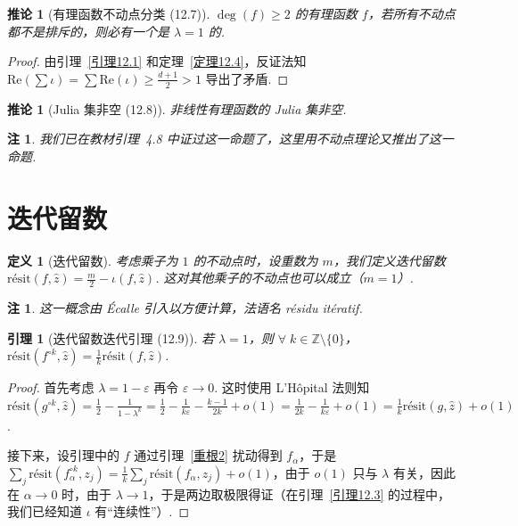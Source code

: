 \documentclass[11pt, a4paper, oneside]{ctexart}
\newtheorem{corollary}[theorem]{推论}
\newtheorem{definition}[theorem]{定义}
\newtheorem{lemma}[theorem]{引理}
\newtheorem{remark}[theorem]{注}
\newcommand{\Z}{\mathbb{Z}}
\newcommand{\re}{\mathrm{Re}}
\newcommand{\ri}{\mathrm{résit}}
\begin{document}
    \begin{corollary}[有理函数不动点分类 (12.7)]
        $\deg(f)\geq 2$ 的有理函数 $f$，若所有不动点都不是排斥的，则必有一个是 $\lambda=1$ 的.
    \end{corollary}
    \begin{proof}
        由引理~\ref{引理12.1} 和定理~\ref{定理12.4}，反证法知 $\re(\sum\iota)=\sum\re(\iota)\geq \frac{d+1}{2}>1$ 导出了矛盾.
    \end{proof}

    \begin{corollary}[Julia 集非空 (12.8)]
        非线性有理函数的 Julia 集非空.
    \end{corollary}
    \begin{remark}
        我们已在教材引理~4.8 中证过这一命题了，这里用不动点理论又推出了这一命题.
    \end{remark}

    \section{迭代留数}

    \begin{definition}[迭代留数]
        考虑乘子为 $1$ 的不动点时，设重数为 $m$，我们定义迭代留数 $\ri(f,\hat{z})=\frac{m}{2}-\iota(f,\hat{z})$. 这对其他乘子的不动点也可以成立（$m=1$）.
    \end{definition}
    \begin{remark}
        这一概念由 Écalle 引入以方便计算，法语名 résidu itératif.
    \end{remark}

    \begin{lemma}[迭代留数迭代引理 (12.9)]\label{引理12.9}
        若 $\lambda=1$，则 $\forall\;k\in\Z\setminus\{0\}$，$\ri(f^{\circ k},\hat{z})=\frac{1}{k}\ri(f,\hat{z})$.
    \end{lemma}
    \begin{proof}
        首先考虑 $\lambda=1-\varepsilon$ 再令 $\varepsilon\to 0$. 这时使用 L'Hôpital 法则知 $\ri(g^{\circ k},\hat{z})=\frac{1}{2}-\frac{1}{1-\lambda^k}=\frac{1}{2}-\frac{1}{k\varepsilon}-\frac{k-1}{2k}+o(1)=\frac{1}{2k}-\frac{1}{k\varepsilon}+o(1)=\frac{1}{k}\ri(g,\hat{z})+o(1)$.

        接下来，设引理中的 $f$ 通过引理~\ref{重根2} 扰动得到 $f_{\alpha}$，于是 $\sum\limits_{j}\ri(f_{\alpha}^{\circ k},z_j)=\frac{1}{k}\sum\limits_{j}\ri(f_{\alpha},z_j)+o(1)$，由于 $o(1)$ 只与 $\lambda$ 有关，因此在 $\alpha\to 0$ 时，由于 $\lambda\to 1$，于是两边取极限得证（在引理~\ref{引理12.3} 的过程中，我们已经知道 $\iota$ 有“连续性”）.
    \end{proof}
\end{document}
